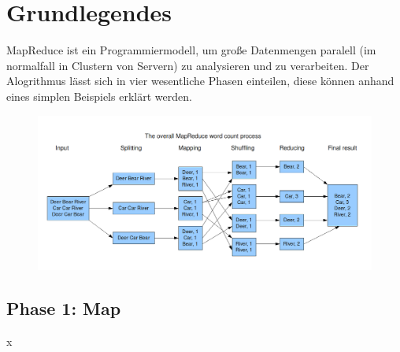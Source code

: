 \chapter{Grundlegendes}

MapReduce ist ein Programmiermodell, um große Datenmengen paralell (im normalfall in Clustern von Servern) zu analysieren und zu verarbeiten. Der Alogrithmus lässt sich in vier wesentliche Phasen einteilen, diese können anhand eines simplen Beispiels erklärt  werden.

\begin{figure}[!h]
	\centering
	\includegraphics[width=\linewidth]{images/Phases.png}
	\caption{}
	\label{robotino_urdf}
\end{figure}

\section{Phase 1: Map}

x 